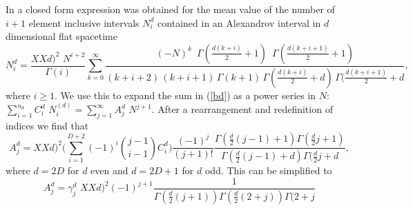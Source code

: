 \documentclass[12pt]{article}
\begin{document}
{In \cite{Glaser_Sumati:Locality_in_Causal_Set} a closed form expression was obtained for the mean value of the number of $i+1$ element inclusive intervals $N_i^d$ contained in an Alexandrov interval in $d$ dimensional flat spacetime 
\begin{equation} N_i^d= \frac{XXd)^2\, \, N^{i+2}}{\Gamma(i)} \sum_{k=0}^\infty \frac{(-N)^k \, \, \, \Gamma(\frac{d(k+i)}{2}+1) \, \, \,  \Gamma(\frac{d(k+i+1)}{2}+1)}{(k+i+2) \, (k+i+1)\, \Gamma(k+1)\, \Gamma(\frac{d(k+i)}{2} +d) \,\Gamma(\frac{d(k+i+1)}{2}+d}, 
\end{equation} 
where $i \geq 1$.  We use this to expand the sum in (\ref{bd}) as a power series in $N$: $\sum_{i=1}^{n_d} C_i^d \, \, N_i^{(d)} = \sum_{j=1}^\infty A_j^d \, \, N^{j+1}$.  After a rearrangement and redefinition of indices we find that 
\begin{equation}
 A_j^d = XXd)^2\biggl( \sum_{i=1}^{D+2} (-1)^i \binom{j-1}{i-1}  C_i^d  \biggr) \frac{(-1)^j}{(j+1)!}\frac{\Gamma(\frac{d}{2}(j-1)+1)\Gamma(\frac{d}{2}j+1)}{\Gamma(\frac{d}{2}(j-1)+d) \Gamma(\frac{d}{2}j+d}, 
\end{equation} 
where $d=2D$ for $d$ even and $d=2D+1$ for $d$ odd.   
This can be simplified to 
\begin{equation}
A_j^d= \gamma_j^d \, \, XXd)^2 (-1)^{j+1} \frac{1}{\Gamma(\frac{d}{2} (j + 1)) \Gamma(\frac{d}{2} (2 + j)) \Gamma(2 + j }

\end{equation}}
\end{document}
